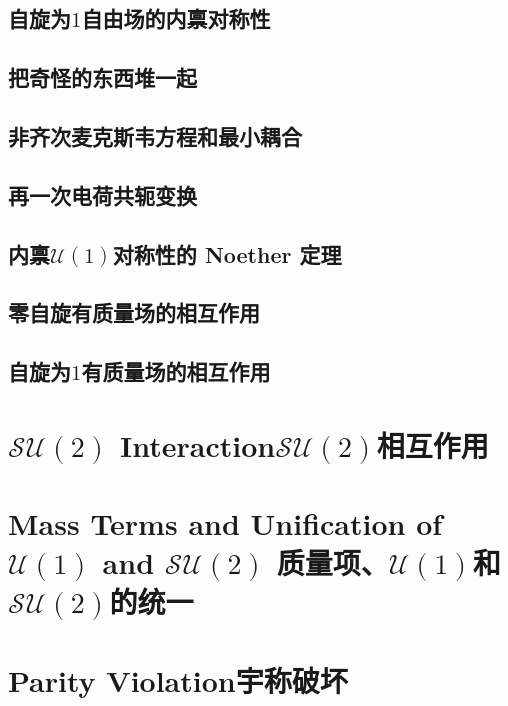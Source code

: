 \subsection{自旋为$1$自由场的内禀对称性}\label{sec7.1.2}

\subsection{把奇怪的东西堆一起}\label{sec7.1.3}

\subsection{非齐次麦克斯韦方程和最小耦合}\label{sec7.1.4}

\subsection{再一次电荷共轭变换}\label{sec7.1.5}

\subsection{内禀${\mathcal U}(1)$对称性的 Noether 定理}\label{sec7.1.6}

\subsection{零自旋有质量场的相互作用}\label{sec7.1.7}

\subsection{自旋为$1$有质量场的相互作用}\label{sec7.1.8}

\section[$\mathcal{SU}(2)$相互作用]{$\mathcal{SU}(2)$ Interaction\quad $\mathcal{SU}(2)$相互作用}\label{sec7.2}

\section[质量项、${\mathcal U}(1)$和$\mathcal{SU}(2)$的统一]{Mass Terms and Unification of ${\mathcal U}(1)$ and $\mathcal{SU}(2)$ \quad 质量项、${\mathcal U}(1)$和$\mathcal{SU}(2)$的统一}\label{sec7.3}

\section[宇称破坏]{Parity Violation\quad 宇称破坏}\label{sec7.4}

